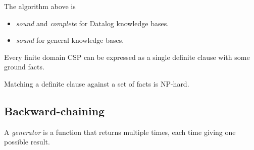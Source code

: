 \documentclass{article}
\begin{document}
\begin{theorem}
    The algorithm above is
    \begin{itemize}
        \item \emph{sound} and \emph{complete} for Datalog knowledge bases.
        \item \emph{sound} for general knowledge bases.
    \end{itemize}
\end{theorem}

\begin{theorem}[R\&N p. 334]
    Every finite domain CSP can be expressed as a
    single definite clause with some ground facts.
\end{theorem}

\begin{theorem}
    Matching a definite clause against a set of facts is NP-hard.
\end{theorem}

\subsection{Backward-chaining}

\begin{definition}[R\&N p. 337]
    A \emph{generator} is a function that returns multiple times, each time giving one
    possible result.
\end{definition}
\end{document}
